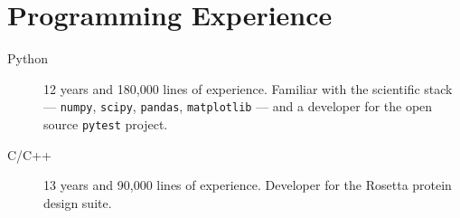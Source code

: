 \section{Programming Experience\protect\footnotemark}

\begin{description}

\item[Python] 
        12 years and 180,000 lines of experience.  Familiar with the scientific 
        stack --- \texttt{numpy}, \texttt{scipy}, \texttt{pandas}, 
        \texttt{matplotlib} --- and a developer for the open source 
        \texttt{pytest} project.

\item[C/C++]
        13 years and 90,000 lines of experience.  Developer for the Rosetta 
        protein design suite.

\end{description}


